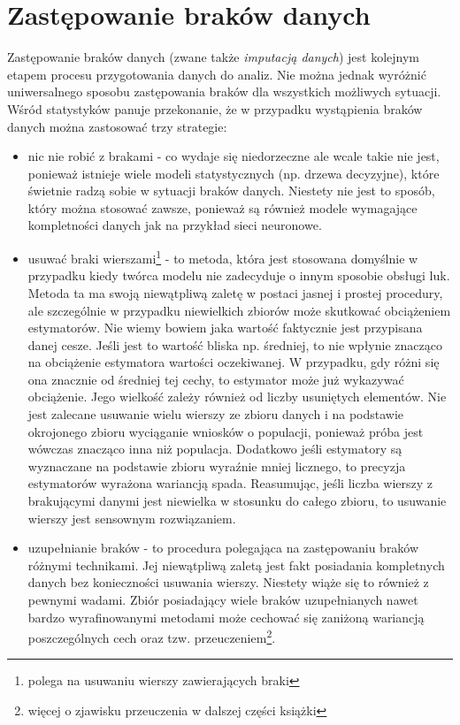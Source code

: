 \documentclass[
]{book}
\providecommand{\tightlist}{%
  \setlength{\itemsep}{0pt}\setlength{\parskip}{0pt}}
\theoremstyle{plain}
\theoremstyle{definition}
\theoremstyle{definition}
\theoremstyle{definition}
\theoremstyle{definition}
\theoremstyle{definition}
\theoremstyle{remark}
\begin{document}
\section{Zastępowanie braków danych}\label{zastux119powanie-brakuxf3w-danych}

Zastępowanie braków danych (zwane także \emph{imputacją danych}) jest kolejnym etapem procesu przygotowania danych do analiz. Nie można jednak wyróżnić uniwersalnego sposobu zastępowania braków dla wszystkich możliwych sytuacji. Wśród statystyków panuje przekonanie, że w przypadku wystąpienia braków danych można zastosować trzy strategie:

\begin{itemize}
\tightlist
\item
  nic nie robić z brakami - co wydaje się niedorzeczne ale wcale takie nie jest, ponieważ istnieje wiele modeli statystycznych (np. drzewa decyzyjne), które świetnie radzą sobie w sytuacji braków danych. Niestety nie jest to sposób, który można stosować zawsze, ponieważ są również modele wymagające kompletności danych jak na przykład sieci neuronowe.
\item
  usuwać braki wierszami\footnote{polega na usuwaniu wierszy zawierających braki} - to metoda, która jest stosowana domyślnie w przypadku kiedy twórca modelu nie zadecyduje o innym sposobie obsługi luk. Metoda ta ma swoją niewątpliwą zaletę w postaci jasnej i prostej procedury, ale szczególnie w przypadku niewielkich zbiorów może skutkować obciążeniem estymatorów. Nie wiemy bowiem jaka wartość faktycznie jest przypisana danej cesze. Jeśli jest to wartość bliska np. średniej, to nie wpłynie znacząco na obciążenie estymatora wartości oczekiwanej. W przypadku, gdy różni się ona znacznie od średniej tej cechy, to estymator może już wykazywać obciążenie. Jego wielkość zależy również od liczby usuniętych elementów. Nie jest zalecane usuwanie wielu wierszy ze zbioru danych i na podstawie okrojonego zbioru wyciąganie wniosków o populacji, ponieważ próba jest wówczas znacząco inna niż populacja. Dodatkowo jeśli estymatory są wyznaczane na podstawie zbioru wyraźnie mniej licznego, to precyzja estymatorów wyrażona wariancją spada. Reasumując, jeśli liczba wierszy z brakującymi danymi jest niewielka w stosunku do całego zbioru, to usuwanie wierszy jest sensownym rozwiązaniem.
\item
  uzupełnianie braków - to procedura polegająca na zastępowaniu braków różnymi technikami. Jej niewątpliwą zaletą jest fakt posiadania kompletnych danych bez konieczności usuwania wierszy. Niestety wiąże się to również z pewnymi wadami. Zbiór posiadający wiele braków uzupełnianych nawet bardzo wyrafinowanymi metodami może cechować się zaniżoną wariancją poszczególnych cech oraz tzw. przeuczeniem\footnote{więcej o zjawisku przeuczenia w dalszej części książki}.
\end{itemize}
\end{document}
